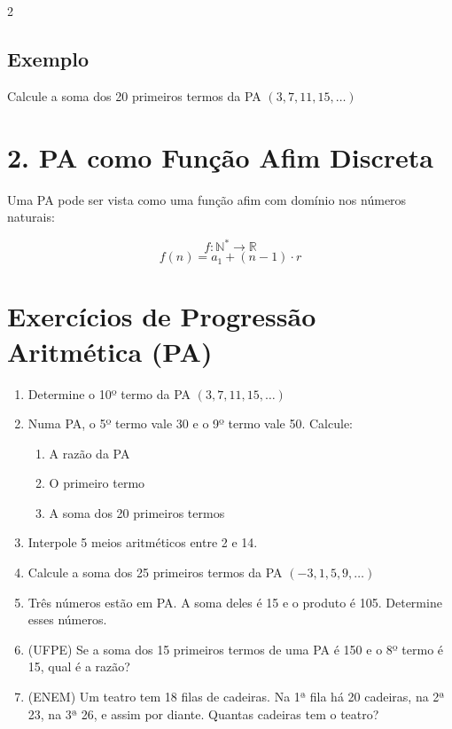 \documentclass[11pt]{article}
\begin{document}
\begin{multicols}{2}
\subsection*{Exemplo}

Calcule a soma dos 20 primeiros termos da PA $(3, 7, 11, 15, \ldots)$

\section*{2. PA como Função Afim Discreta}
Uma PA pode ser vista como uma função afim com domínio nos números naturais:

\[
f: \mathbb{N}^* \rightarrow \mathbb{R}
\]
\[
f(n) = a_1 + (n-1) \cdot r
\]

\section*{Exercícios de Progressão Aritmética (PA)}

\begin{enumerate}[leftmargin=*]

\item Determine o 10º termo da PA $(3, 7, 11, 15, \ldots)$

\item Numa PA, o 5º termo vale 30 e o 9º termo vale 50. Calcule:
\begin{enumerate}[label=\alph*)]
\item A razão da PA
\item O primeiro termo
\item A soma dos 20 primeiros termos
\end{enumerate}

\item Interpole 5 meios aritméticos entre 2 e 14.

\item Calcule a soma dos 25 primeiros termos da PA $(-3, 1, 5, 9, \ldots)$

\item Três números estão em PA. A soma deles é 15 e o produto é 105. Determine esses números.

\item (UFPE) Se a soma dos 15 primeiros termos de uma PA é 150 e o 8º termo é 15, qual é a razão?

\item (ENEM) Um teatro tem 18 filas de cadeiras. Na 1ª fila há 20 cadeiras, na 2ª 23, na 3ª 26, e assim por diante. Quantas cadeiras tem o teatro?


\end{enumerate}
\end{multicols}
\end{document}
